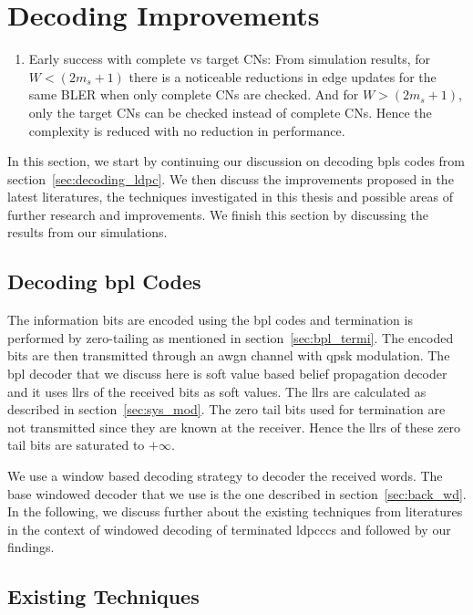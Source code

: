 \section{Decoding Improvements}
\begin{enumerate}
  \item Early success with complete vs target CNs: From simulation results, for $W<(2m_s+1)$ there is a noticeable reductions in edge updates for the same BLER when only complete CNs are checked. And for $W>(2m_s+1)$, only the target CNs can be checked instead of complete CNs. Hence the complexity is reduced with no reduction in performance.
\end{enumerate}


In this section, we start by continuing our discussion on decoding \acp{bpl} codes from section~\ref{sec:decoding_ldpc}. We then discuss the improvements proposed in the latest literatures, the techniques investigated in this thesis and possible areas of further research and improvements. We finish this section by discussing the results from our simulations.

\subsection{Decoding \acl{bpl} Codes}
The information bits are encoded using the \ac{bpl} codes and termination is performed by zero-tailing as mentioned in section~\ref{sec:bpl_termi}. The encoded bits are then transmitted through an \ac{awgn} channel with \ac{qpsk} modulation. The \ac{bpl} decoder that we discuss here is soft value based belief propagation decoder and it uses \acp{llr} of the received bits as soft values. The \acp{llr} are calculated as described in section~\ref{sec:sys_mod}. The zero tail bits used for termination are not transmitted since they are known at the receiver. Hence the \acp{llr} of these zero tail bits are saturated to $+\infty$.

We use a window based decoding strategy to decoder the received words. The base windowed decoder that we use is the one described in section~\ref{sec:back_wd}. In the following, we discuss further about the existing techniques from literatures in the context of windowed decoding of terminated \acp{ldpccc} and followed by our findings.

\subsection{Existing Techniques}